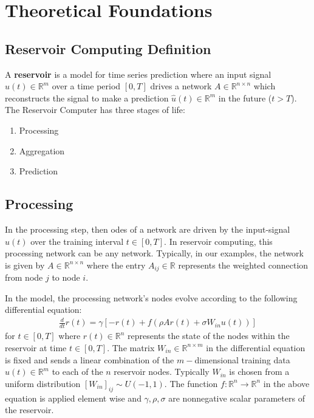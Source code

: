 \documentclass[12pt,oneside]{article}
\theoremstyle{plain}
\begin{document}
\section{Theoretical Foundations}
\subsection{Reservoir Computing Definition}
A \textbf{reservoir} is a model for time series prediction where an input signal $u(t) \in \mathbb{R}^m$ over a time period $[0,T]$ drives a network $A \in \mathbb{R}^{n\times n}$ 
which reconstructs the signal to make a prediction $\hat{u}(t) \in \mathbb{R}^m$ in the future ($t > T$).  The Reservoir Computer has three stages of life:
\begin{enumerate}
    \item Processing
    \item Aggregation
    \item Prediction
\end{enumerate}

\subsection{Processing}
In the processing step, then odes of a network are driven by the input-signal $u(t)$ over the training interval $t \in [0,T]$.  In reservoir computing, this processing network
can be any network.  Typically, in our examples, the network is given by $A \in \mathbb{R}^{n\times n}$ where the entry $A_{ij} \in \mathbb{R}$ represents the weighted
connection from node $j$ to node $i$.

In the model, the processing network's nodes evolve according to the following differential equation:
\begin{align*}
    \frac{d}{dt}r(t) = \gamma [-r(t) + f(\rho A r(t) + \sigma W_{in}u(t))]
\end{align*}
for $t \in [0,T]$ where $r(t) \in \mathbb{R}^n$ represents the state of the nodes within the reservoir at time $t \in [0,T]$.  The matrix $W_{in} \in \mathbb{R}^{n\times m}$
in the differential equation is fixed and sends a linear combination of the $m-$dimensional training data $u(t) \in \mathbb{R}^m$ to each of the $n$ reservoir nodes.  
Typically $W_{in}$ is chosen from a uniform distribution $[W_{in}]_{ij} \sim U(-1,1)$.  The function $f:\mathbb{R}^n \rightarrow \mathbb{R}^n$ in the above equation is applied
element wise and $\gamma, \rho, \sigma$ are nonnegative scalar parameters of the reservoir.
\end{document}
